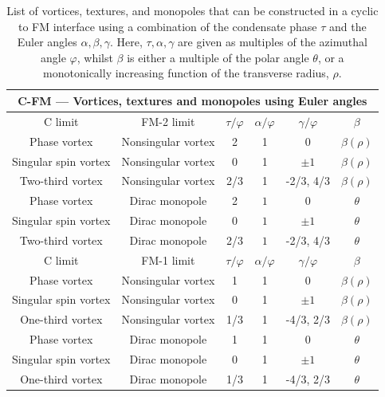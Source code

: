 \begin{table}
    \centering
    \begin{tabular}{cccccc}
        \toprule
        \multicolumn{6}{c}{C-FM --- Vortices, textures and monopoles using Euler
            angles} \\
        \midrule
        C limit & FM-2 limit &  \(\tau/\varphi\) & \(\alpha/\varphi\)
            & \(\gamma/\varphi\) & \(\beta\) \\
        \midrule
        Phase vortex & Nonsingular vortex & 2 & 1 & 0 & \(\beta(\rho)\) \\ 
        Singular spin vortex & Nonsingular vortex & 0 & 1 & \(\pm 1\)
            & \(\beta(\rho)\) \\ 
        Two-third vortex & Nonsingular vortex & 2/3 & 1 & -2/3, 4/3
            & \(\beta(\rho)\) \\
        Phase vortex & Dirac monopole & 2 & \(1\) & 0 & \(\theta\) \\ 
        Singular spin vortex & Dirac monopole & 0 & \( 1\) & \(\pm 1\)
            & \(\theta\) \\ 
        Two-third vortex & Dirac monopole & 2/3 & \( 1\) & -2/3, 4/3
            & \(\theta\) \\
        \bottomrule
        \midrule
        C limit & FM-1 limit &  \(\tau/\varphi\) & \(\alpha/\varphi\)
            & \(\gamma/\varphi\) & \(\beta\) \\
        \midrule
        Phase vortex & Nonsingular vortex & 1 & 1 & 0 & \(\beta(\rho)\) \\ 
        Singular spin vortex & Nonsingular vortex & 0 & 1 & \(\pm 1\)
            & \(\beta(\rho)\) \\ 
        One-third vortex & Nonsingular vortex & 1/3 & 1 & -4/3, 2/3
            & \(\beta(\rho)\) \\
        Phase vortex & Dirac monopole & 1 & 1 & 0 & \(\theta\) \\ 
        Singular spin vortex & Dirac monopole & 0 & 1 & \(\pm 1\) & \(\theta\)\\ 
        One-third vortex & Dirac monopole & 1/3 & 1 & -4/3, 2/3 & \(\theta\) \\
        \bottomrule
    \end{tabular}
    \caption{\label{tab: C-FM-other}List of vortices, textures, and monopoles
    that can be constructed in a cyclic to FM interface using a combination
    of the condensate phase \(\tau\) and the Euler angles \(\alpha, \beta,
    \gamma\).
    Here, \(\tau, \alpha, \gamma\) are given as multiples of the azimuthal angle
    \(\varphi\), whilst \(\beta\) is either a multiple of the polar angle
    \(\theta\), or a monotonically increasing function of the transverse radius,
    \(\rho\).}
\end{table}

